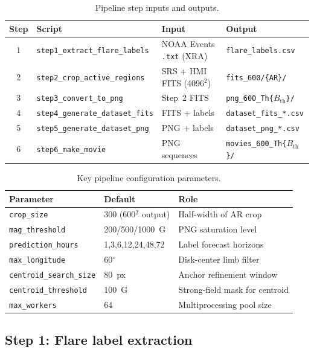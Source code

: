 \documentclass[]{spie}
\begin{document}
\begin{table}[t]
\caption{Pipeline step inputs and outputs.}
\label{tab:pipeline}
\centering
\scriptsize
\begin{tabular}{@{}clp{3.5cm}p{3.0cm}@{}}
\toprule
Step & Script & Input & Output \\
\midrule
1 & \texttt{step1\_extract\_flare\_labels} & NOAA Events \texttt{.txt} (XRA) & \texttt{flare\_labels.csv} \\
2 & \texttt{step2\_crop\_active\_regions} & SRS + HMI FITS (4096$^2$) & \texttt{fits\_600/\{AR\}/} \\
3 & \texttt{step3\_convert\_to\_png} & Step~2 FITS & \texttt{png\_600\_Th\{$B_{\mathrm{th}}$\}/} \\
4 & \texttt{step4\_generate\_dataset\_fits} & FITS + labels & \texttt{dataset\_fits\_*.csv} \\
5 & \texttt{step5\_generate\_dataset\_png} & PNG + labels & \texttt{dataset\_png\_*.csv} \\
6 & \texttt{step6\_make\_movie} & PNG sequences & \texttt{movies\_600\_Th\{$B_{\mathrm{th}}$\}/} \\
\bottomrule
\end{tabular}
\end{table}

\begin{table}[t]
\caption{Key pipeline configuration parameters.}
\label{tab:config}
\centering
\scriptsize
\begin{tabular}{@{}llp{4.2cm}@{}}
\toprule
Parameter & Default & Role \\
\midrule
\texttt{crop\_size} & 300 (600$^2$ output) & Half-width of AR crop \\
\texttt{mag\_threshold} & 200/500/1000~G & PNG saturation level \\
\texttt{prediction\_hours} & 1,3,6,12,24,48,72 & Label forecast horizons \\
\texttt{max\_longitude} & 60$^\circ$ & Disk-center limb filter \\
\texttt{centroid\_search\_size} & 80~px & Anchor refinement window \\
\texttt{centroid\_threshold} & 100~G & Strong-field mask for centroid \\
\texttt{max\_workers} & 64 & Multiprocessing pool size \\
\bottomrule
\end{tabular}
\end{table}

\subsection{Step 1: Flare label extraction}
\end{document}
